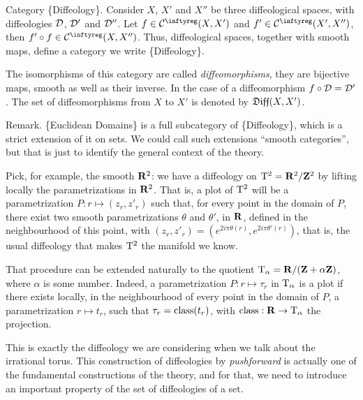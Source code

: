 \begin{Article}{Category \{Diffeology\}.}
  Consider $X$,
  $X'$ and $X''$ be three diffeological spaces,
  with diffeologies $\mathcal{D}$,
  $\mathcal{D}'$ and $\mathcal{D}''$.
  Let $f \in \Cinfty(X,X')$ and $f' \in \Cinfty(X',X'')$,
  then $f' \circ f \in \Cinfty(X,X'')$.
  Thus,
  diffeological spaces,
  together with smooth maps,
  define a category we write \{Diffeology\}.
  
  The isomorphisms of this category are called \emph{diffeomorphisms},
  they are bijective maps,
  smooth as well as their inverse.
  In the case of a diffeomorphism $f \circ \mathcal{D} = \mathcal{D}'$.
  The set of diffeomorphisms from $X$ to $X'$ is denoted by $\mathfrak{Diff}(X,X')$.
\end{Article}

\begin{Article}{Remark.}{}
  \{Euclidean Domains\} is a full subcategory of \{Diffeology\},
  which is a strict extension of it on sets.
  We could call such extensions ``smooth categories'',
  but that is just to identify the general context of the theory.
\end{Article}

Pick,
for example,
the smooth $\mathbf{R}^2$:
we have a diffeology on $\mathrm{T}^2 = \mathbf{R}^2/\mathbf{Z}^2$ by lifting locally the parametrizations in $\mathbf{R}^2$.
That is,
a plot of $\mathrm{T}^2$ will be a parametrization $P \colon r \mapsto (z_r,z'_r)$ such that,
for every point in the domain of $P$,
there exist two smooth parametrizations $\theta$ and $\theta'$, in $\mathbf{R}$,
defined in the neighbourhood of this point,
with $(z_r,z'_r)= (e^{2i\pi\theta(r)},e^{2i\pi\theta'(r)})$,
that is,
the usual diffeology that makes $\mathrm{T}^2$ the manifold we know.

That procedure can be extended naturally to the quotient $\mathrm{T}_\alpha = \mathbf{R}/(\mathbf{Z} + \alpha \mathbf{Z})$,
where $\alpha$ is some number.
Indeed,
a parametrization $P \colon r \mapsto \tau_r$ in $\mathrm{T}_\alpha$ is a plot if there exists locally,
in the neighbourhood of every point in the domain of $P$,
a parametrization $r \mapsto t_r$,
such that $\tau_r= \operatorname{class}(t_r)$,
with $\operatorname{class} : \mathbf{R} \to \mathrm{T}_\alpha$ the projection.

This is exactly the diffeology we are considering when we talk about the irrational torus.
This construction of diffeologies by \emph{pushforward} is actually one of the fundamental constructions of the theory,
and for that,
we need to introduce an important property of the set of diffeologies of a set.

